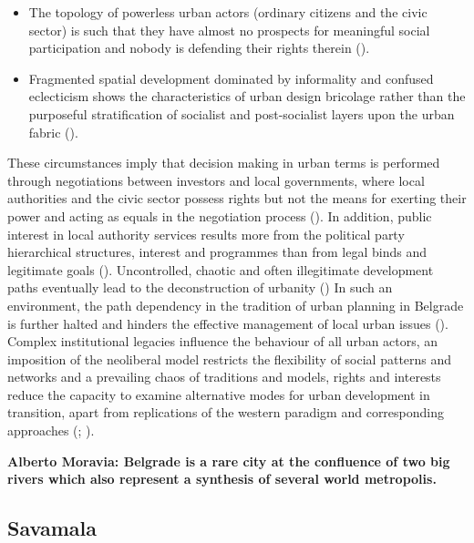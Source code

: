 \documentclass[11pt]{report}
\begin{document}
{{{{\begin{itemize}
\item The topology of powerless urban actors (ordinary citizens and the civic sector) is such that they have almost no prospects for meaningful social participation and nobody is defending their rights therein (\href{Vujovic}{\citealt{vujovic_belgrades_2007}}).

\item Fragmented spatial development dominated by informality and confused eclecticism shows the characteristics of urban design bricolage rather than the purposeful stratification of socialist and post-socialist layers upon the urban fabric (\href{Hirt}{\citealt{hirt_belgrade_2009}}). 
\end{itemize}

These circumstances imply that decision making in urban terms is performed through negotiations between investors and local governments, where local authorities and the civic sector possess rights but not the means for exerting their power and acting as equals in the negotiation process  (\href{Bajec}{\citealt{bajec_rational_2009}}).
In addition, public interest in local authority services results more from the political party hierarchical structures, interest and programmes than from legal binds and legitimate goals (\href{Djokic}{\citealt{djokic_political_2007}}).
Uncontrolled, chaotic and often illegitimate development paths eventually lead to the deconstruction of urbanity (\href{Vujosevic}{\citealt{vujovic_belgrades_2007}})
In such an environment, the path dependency in the tradition of urban planning in Belgrade is further halted and hinders the effective management of local urban issues (\href{Nedovic}{\citealt{nedovic-budic_adjustment_2001}}).
Complex institutional legacies influence the behaviour of all urban actors, an imposition of the neoliberal model restricts the flexibility of social patterns and networks and a prevailing chaos of traditions and models, rights and interests reduce the capacity to examine alternative modes for urban development in transition, apart from replications of the western paradigm and corresponding approaches  
(\href{Tsenkova}{\citealt{tsenkova_urban_2007}}; \href{Petrovic}{\citealt{petrovic_cities_2009}}).
   
\textbf{Alberto Moravia: Belgrade is a rare city at the confluence of two big rivers which also represent a synthesis of several world metropolis.}

\subsection{Savamala}

}}}}
\end{document}

